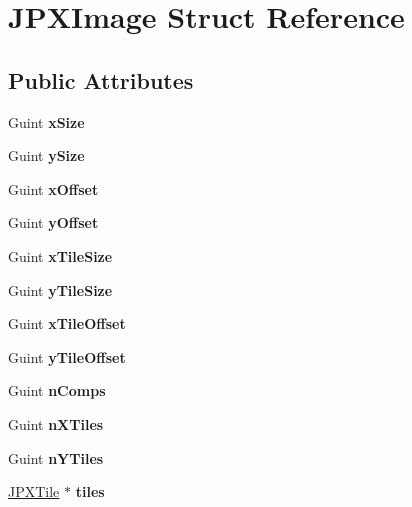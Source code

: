 \hypertarget{struct_j_p_x_image}{}\section{J\+P\+X\+Image Struct Reference}
\label{struct_j_p_x_image}
\subsection*{Public Attributes}
\begin{DoxyCompactItemize}
\item 
\mbox{\label{struct_j_p_x_image_a844d77ac8472ae04ce92bc5ed36ac46e}} 
Guint {\bfseries x\+Size}
\item 
\mbox{\label{struct_j_p_x_image_aeb970d883c8feaf9d283575bf8f54897}} 
Guint {\bfseries y\+Size}
\item 
\mbox{\label{struct_j_p_x_image_a906a3aecd89b0c623d5559af2417b204}} 
Guint {\bfseries x\+Offset}
\item 
\mbox{\label{struct_j_p_x_image_add5d596dae5fca57f81af7f12a24ef35}} 
Guint {\bfseries y\+Offset}
\item 
\mbox{\label{struct_j_p_x_image_aad571d2f92dfb4f10262436955a615ee}} 
Guint {\bfseries x\+Tile\+Size}
\item 
\mbox{\label{struct_j_p_x_image_ae3646da7047b89706c5b08ac699055e1}} 
Guint {\bfseries y\+Tile\+Size}
\item 
\mbox{\label{struct_j_p_x_image_af3dde51a7a9d34863890d6965c1e71b9}} 
Guint {\bfseries x\+Tile\+Offset}
\item 
\mbox{\label{struct_j_p_x_image_a334314d575863bd0f69a78564c76d2a3}} 
Guint {\bfseries y\+Tile\+Offset}
\item 
\mbox{\label{struct_j_p_x_image_aaa543b19e58a5f263b8936a87889bb66}} 
Guint {\bfseries n\+Comps}
\item 
\mbox{\label{struct_j_p_x_image_a06641a0a42273fc8f50ffd25d03dc6d2}} 
Guint {\bfseries n\+X\+Tiles}
\item 
\mbox{\label{struct_j_p_x_image_a123dc52bcd3c6c074b2c389e6711e518}} 
Guint {\bfseries n\+Y\+Tiles}
\item 
\mbox{\label{struct_j_p_x_image_acdad0dba50718ceff33ed2065da79a52}} 
\hyperlink{struct_j_p_x_tile}{J\+P\+X\+Tile} $\ast$ {\bfseries tiles}
\end{DoxyCompactItemize}


